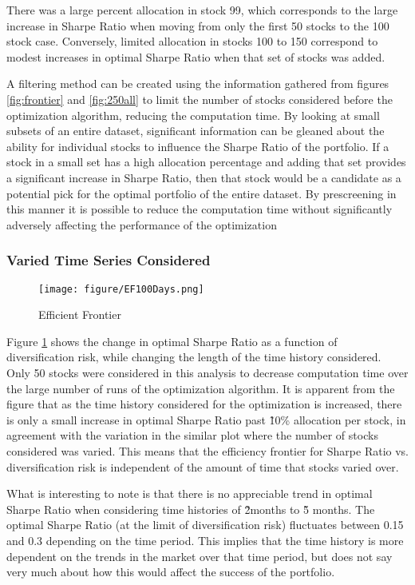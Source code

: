 There was a large percent allocation in stock 99, which corresponds to the large increase in Sharpe Ratio when moving from only the first 50 stocks to the 100 stock case. Conversely, limited allocation in stocks 100 to 150 correspond to modest increases in optimal Sharpe Ratio when that set of stocks was added.

A filtering method can be created using the information gathered from figures \ref{fig:frontier} and \ref{fig:250all} to limit the number of stocks considered before the optimization algorithm, reducing the computation time. By looking at small subsets of an entire dataset, significant information can be gleaned about the ability for individual stocks to influence the Sharpe Ratio of the portfolio. If a stock in a small set has a high allocation percentage and adding that set provides a significant increase in Sharpe Ratio, then that stock would be a candidate as a potential pick for the optimal portfolio of the entire dataset. By prescreening in this manner it is possible to reduce the computation time without significantly adversely affecting the performance of the optimization

\subsubsection{Varied Time Series Considered}

\begin{figure}[H]
\centering
\texttt{[image: figure/EF100Days.png]}\\
\caption{Efficient Frontier\label{fig:EF100}}
\end{figure}

Figure \ref{fig:EF100} shows the change in optimal Sharpe Ratio as a 
function of diversification risk, while changing the length of the time history 
considered. Only 50 stocks were considered in this analysis to decrease 
computation time over the large number of runs of the optimization algorithm. It is 
apparent from the figure that as the time history considered for the optimization is 
increased, there is only a small increase in optimal Sharpe Ratio past \~10\% 
allocation per stock, in agreement with the variation in the similar plot where the 
number of stocks considered was varied. This means that the efficiency frontier for 
Sharpe Ratio vs. diversification risk is independent of the amount of time that stocks
varied over. 

What is interesting to note is that there is no appreciable trend in optimal 
Sharpe Ratio when considering time histories of \~2months to \~5 months. The 
optimal Sharpe Ratio (at the limit of diversification risk) fluctuates between 0.15 
and 0.3 depending on the time period. This implies that the time history is more 
dependent on the trends in the market over that time period, but does not say very 
much about how this would affect the success of the portfolio. 
